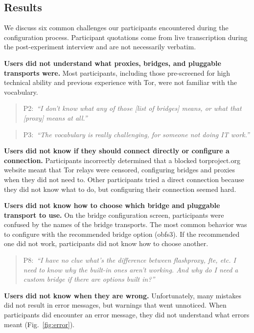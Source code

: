 \documentclass[USenglish,oneside,twocolumn]{article}
\newcommand{\pquote}[2]{
\begin{quotation}
\noindent #1:~\textit{``#2''}
\end{quotation}
}
\begin{document}
\subsection{Results} 
We discuss six common challenges our participants encountered during the configuration process.
Participant quotations come from live transcription during the post-experiment interview
and are not necessarily verbatim.\\

\begin{description}
\item {\bfseries Users did not understand what proxies, bridges, and pluggable transports were.}
Most participants, including those pre-screened for high technical ability and previous experience with Tor, were not familiar with the vocabulary.

\smallskip
\pquote{P2}{I don't know what any of those [list of bridges] means, or what that [proxy] means at all.}
\smallskip
\pquote{P3}{The vocabulary is really challenging, for someone not doing IT work.}
\smallskip

\item {\bfseries Users did not know if they should connect directly or configure a connection.}
Participants incorrectly determined that a blocked torproject.org website meant that Tor relays were censored, configuring bridges and proxies when they did not need to. Other participants tried a direct connection because they did not know what to do, but configuring their connection seemed hard. 

\item {\bfseries Users did not know how to choose which bridge and pluggable transport to use.}
On the bridge configuration screen, participants were confused by the names of the bridge transports. The most common behavior was to configure with the recommended bridge option (obfs3). If the recommended one did not work, participants did not know how to choose another. 

\smallskip
\pquote{P8}{I have no clue what's the difference between flashproxy, fte, etc. I need to know why the built-in ones aren't working. And why do I need a custom bridge if there are options built in?}
\smallskip

\item {\bfseries Users did not know when they are wrong.}
Unfortunately, many mistakes did not result in error messages, but warnings that went unnoticed.
When participants did encounter an error message, they did not understand what errors meant (Fig.~\ref{fig:error}).


\end{description}
\end{document}
